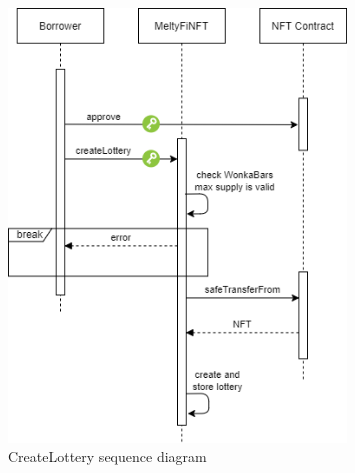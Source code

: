 \begin{figure}[h]
    \centering
    \includegraphics[width=0.8\textwidth]{figures/CreateLottery.png}
    \caption{CreateLottery sequence diagram}
    \label{fig:CreateLottery}
\end{figure}

